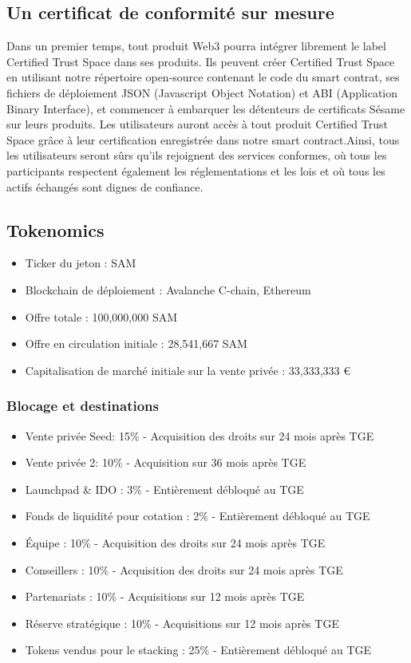 ﻿\documentclass[a4paper]{article}
\let\OldTexttrademark\texttrademark
\renewcommand{\texttrademark}{\OldTexttrademark\xspace}%
\begin{document}
\subsection{Un certificat de conformité sur mesure} 
Dans un premier temps, tout produit Web3 pourra intégrer librement le label Certified Trust Space\texttrademark dans ses produits. Ils peuvent créer Certified Trust Space\texttrademark en utilisant notre répertoire open-source contenant le code du smart contrat, ses fichiers de déploiement JSON (Javascript Object Notation) et ABI (Application Binary Interface), et commencer à embarquer les détenteurs de certificats Sésame sur leurs produits. Les utilisateurs auront accès à tout produit Certified Trust Space\texttrademark grâce à leur certification enregistrée dans notre smart contract.Ainsi, tous les utilisateurs seront sûrs qu'ils rejoignent des services conformes, où tous les participants respectent également les réglementations et les lois et où tous les actifs échangés sont dignes de confiance.
\subsection{Tokenomics}
\begin{itemize}
\item Ticker du jeton : SAM
\item Blockchain de d\'eploiement : Avalanche C-chain, Ethereum
\item Offre totale : 100,000,000 SAM
\item Offre en circulation initiale : 28,541,667 SAM
\item Capitalisation de marché initiale sur la vente privée :  33,333,333 €
\end{itemize}

\subsubsection{Blocage et destinations}
\begin{itemize}
\item Vente privée Seed: 15\% - Acquisition des droits sur 24 mois après TGE
\item Vente privée 2: 10\% - Acquisition sur 36 mois après TGE
\item Launchpad \& IDO : 3\% - Entièrement débloqué au TGE
\item Fonds de liquidité pour cotation : 2\% - Entièrement débloqué au TGE
\item Équipe : 10\% - Acquisition des droits sur 24 mois après TGE
\item Conseillers : 10\% - Acquisition des droits sur 24 mois après TGE
\item Partenariats : 10\% - Acquisitions sur 12 mois après TGE
\item Réserve stratégique : 10\% - Acquisitions sur 12 mois après TGE
\item Tokens vendus pour le stacking : 25\% - Entièrement débloqué au TGE
\end{itemize}
\end{document}
